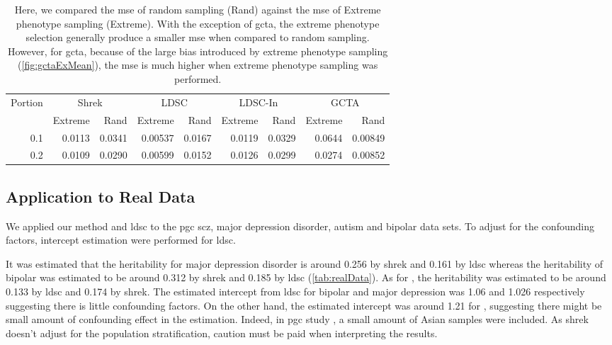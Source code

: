 		
		\begin{table}
			\centering
			\begin{tabular}{rrrrrrrrr}
				\toprule
				\multirow{2}[4]{*}{Portion} & \multicolumn{2}{c}{Shrek} & \multicolumn{2}{c}{LDSC} & \multicolumn{2}{c}{LDSC-In} & \multicolumn{2}{c}{GCTA} \\
				& Extreme & Rand & Extreme & Rand & Extreme & Rand & Extreme & Rand\\
				\midrule
				0.1   & 0.0113 & 0.0341 & 0.00537 & 0.0167 & 0.0119 & 0.0329 & 0.0644 & 0.00849 \\
				0.2   & 0.0109 & 0.0290 & 0.00599 & 0.0152 & 0.0126 & 0.0299 & 0.0274 & 0.00852 \\
				\bottomrule
			\end{tabular}
			\caption[Comparing the MSE of Extreme Phenotype Sampling and Random Sampling]{
				Here, we compared the \gls{mse} of random sampling (Rand) against the \gls{mse} of Extreme phenotype sampling (Extreme). 
				With the exception of \gls{gcta}, the extreme phenotype selection generally produce a smaller \gls{mse} when compared to random sampling. 
				However, for \gls{gcta}, because of the large bias introduced by extreme phenotype sampling (\cref{fig:gctaExMean}), the \gls{mse} is much higher when extreme phenotype sampling was performed.
			}
			\label{tab:ratioEx}
		\end{table}
		
		
		\subsection{Application to Real Data}
		We applied our method and \gls{ldsc} to the \gls{pgc} \gls{scz}, major depression disorder, autism and bipolar data sets.
		To adjust for the confounding factors, intercept estimation were performed for \gls{ldsc}. 
		
		It was estimated that the heritability for major depression disorder is around 0.256 by \gls{shrek} and 0.161 by \gls{ldsc} whereas the heritability of bipolar was estimated to be around 0.312 by \gls{shrek} and 0.185 by \gls{ldsc} (\cref{tab:realData}).
		As for , the heritability was estimated to be around 0.133 by \gls{ldsc} and 0.174 by \gls{shrek}.
		The estimated intercept from \gls{ldsc} for bipolar and major depression was 1.06 and 1.026 respectively suggesting there is little confounding factors. 
		On the other hand, the estimated intercept was around 1.21 for , suggesting there might be small amount of confounding effect in the estimation.
		Indeed, in \gls{pgc}  study \citep{Ripke2014}, a small amount of Asian samples were included.
		As \gls{shrek} doesn't adjust for the population stratification, caution must be paid when interpreting the results.
		
